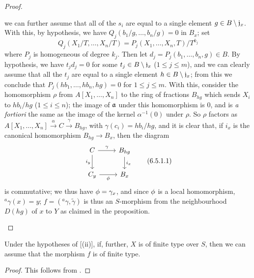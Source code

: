 \begin{proof}
\begin{enumerate}[label=\rm(\roman*)]
        we can further assume that all of the $s_i$ are equal to a single element $g\in B\setminus\mathfrak{j}_x$.
        With this, by hypothesis, we have $Q_j(b_1/g,\ldots,b_n/g)=0$ in $B_x$;
        set
        \begin{equation*}
            Q_j(X_1/T,\ldots,X_n/T) = P_j(X_1,\ldots,X_n,T)/T^{k_j}
        \end{equation*}
        where $P_j$ is homogeneous of degree $k_j$.
        Then let $d_j=P_j(b_1,\ldots,b_n,g)\in B$.
        By hypothesis, we have $t_jd_j=0$ for some $t_j\in B\setminus\mathfrak{j}_x$ ($1\leqslant j\leqslant m$), and we can clearly assume that all the $t_j$ are equal to a single element $h\in B\setminus\mathfrak{j}_x$;
        from this we conclude that $P_j(hb_1,\ldots,hb_n,hg)=0$ for $1\leqslant j\leqslant m$.
        With this, consider the homomorphism $\rho$ from $A[X_1,\ldots,X_n]$ to the ring of fractions $B_{hg}$ which sends $X_i$ to $hb_i/hg$ ($1\leqslant i\leqslant n$);
        the image of $\mathfrak{a}$ under this homomorphism is $0$, and is \emph{a fortiori} the same as the image of the kernel $\alpha^{-1}(0)$ under $\rho$.
        So $\rho$ factors as $A[X_1,\ldots,X_n]\xrightarrow{\alpha}C\xrightarrow{\gamma}B_{hg}$, with $\gamma(c_i)=hb_i/hg$, and it is clear that, if $i_x$ is the canonical homomorphism $B_{hg}\to B_x$, then the diagram
        \begin{equation*}
            \begin{tikzcd}
                C \ar[r,"\gamma"] \ar[d,swap,"i_y"]
                & B_{hg} \ar[d,"i_x"]\\
                C_y \ar[r,swap,"\vphi"]
                & B_x
            \end{tikzcd}
            \tag{6.5.1.1}
        \end{equation*}
        is commutative;
        we thus have $\phi=\gamma_x$, and since $\phi$ is a local homomorphism, $^a\gamma(x)=y$;
        $f=({}^a\gamma,\widetilde{\gamma})$ is thus an $S$-morphism from the neighbourhood $D(hg)$ of $x$ to $Y$ as claimed in the proposition.
\end{enumerate}
\end{proof}

\begin{cor}[6.5.2]
\label{1.6.5.2}
Under the hypotheses of [(ii)], if, further, $X$ is of finite type over $S$, then we can assume that the morphism $f$ is of finite type.
\end{cor}

\begin{proof}
\label{proof-1.6.5.2}
This follows from .
\end{proof}

